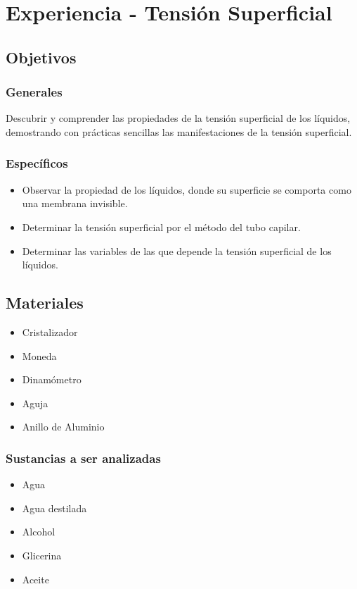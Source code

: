 \documentclass[11pt, letterpaper]{article}
\begin{document}
\section{Experiencia - Tensión Superficial}
\subsection{Objetivos}
\subsubsection{Generales}
Descubrir y comprender las propiedades de la tensión superficial de los líquidos, demostrando con prácticas sencillas las manifestaciones de la tensión superficial.
\subsubsection{Específicos}
\begin{itemize}
	\item Observar la propiedad de los líquidos, donde su superficie se comporta como una membrana invisible.
	\item Determinar la tensión superficial por el método del tubo capilar.
	\item Determinar las variables de las que depende la tensión superficial de los líquidos.
\end{itemize}
\subsection{Materiales}
\begin{itemize}
	\item Cristalizador
	\item Moneda
	\item Dinamómetro
	\item Aguja
	\item Anillo de Aluminio
\end{itemize}
\subsubsection{Sustancias a ser analizadas}
\begin{itemize}
	\item Agua
	\item Agua destilada
	\item Alcohol
	\item Glicerina
	\item Aceite
\end{itemize}
\end{document}
